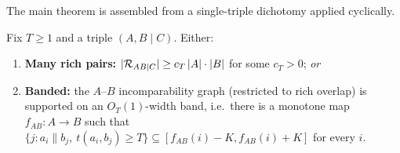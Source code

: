 The main theorem is assembled from a single-triple dichotomy applied cyclically.

\begin{proposition}\label{prop:single-triple}
Fix $T \ge 1$ and a triple $(A, B \mid C)$. Either:
\begin{enumerate}[label=(\roman*)]
  \item \textbf{Many rich pairs:} $|\mathcal{R}_{AB \mid C}| \ge c_T\, |A|\cdot|B|$ for
    some $c_T > 0$; \emph{or}
  \item \textbf{Banded:} the $A$--$B$ incomparability graph (restricted to rich
    overlap) is supported on an $O_T(1)$-width band, i.e.\ there is a monotone
    map $f_{AB}: A \to B$ such that $\{j : a_i \parallel b_j,\ t(a_i,b_j) \ge T\}
    \subseteq [f_{AB}(i) - K, f_{AB}(i) + K]$ for every $i$.
\end{enumerate}
\end{proposition}

